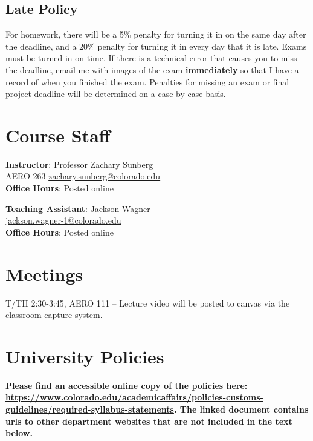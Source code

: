 \documentclass[9pt]{article}
\begin{document}
\subsection*{Late Policy}

For homework, there will be a 5\% penalty for turning it in on the same day after the deadline, and a 20\% penalty for turning it in every day that it is late. Exams must be turned in on time. If there is a technical error that causes you to miss the deadline, email me with images of the exam \textbf{immediately} so that I have a record of when you finished the exam. Penalties for missing an exam  or final project deadline will be determined on a case-by-case basis.

\section*{Course Staff}

\begin{multicols}{2}
    \begin{minipage}{\columnwidth}
        \textbf{Instructor}: Professor Zachary Sunberg\\
        AERO 263 \href{mailto://zachary.sunberg@colorado.edu}{zachary.sunberg@colorado.edu}\\
        \textbf{Office Hours}: Posted online
    \end{minipage}

    \begin{minipage}{\columnwidth}
        \textbf{Teaching Assistant}: Jackson Wagner\\
        \href{mailto://jackson.wagner-1@colorado.edu}{jackson.wagner-1@colorado.edu}\\
        \textbf{Office Hours}: Posted online
    \end{minipage}
\end{multicols}

\section*{Meetings}

T/TH 2:30-3:45, AERO 111 -- Lecture video will be posted to canvas via the classroom capture system.

\section*{University Policies}

\textbf{Please find an accessible online copy of the policies here: \url{https://www.colorado.edu/academicaffairs/policies-customs-guidelines/required-syllabus-statements}. The linked document contains urls to other department websites that are not included in the text below.}
\end{document}
